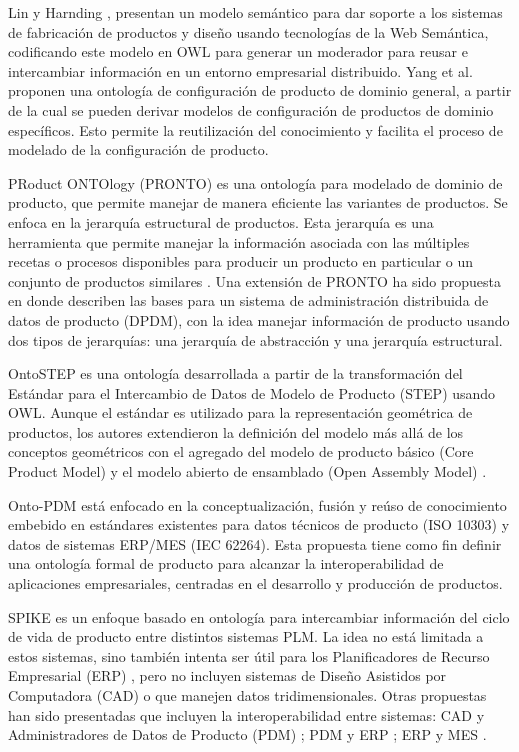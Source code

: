 \documentclass[journal]{IEEEtran}
\begin{document}
Lin y Harnding \cite{Lin2007}, presentan un modelo sem\'antico para dar soporte a los sistemas de fabricaci\'on de productos y dise\~no usando tecnolog\'ias de la Web Sem\'antica, codificando este modelo en OWL para generar un moderador para reusar e intercambiar informaci\'on en un entorno empresarial distribuido.
Yang et al. \cite{Yang2009} proponen una ontolog\'ia de configuraci\'on de producto de dominio general, a partir de la cual se pueden derivar modelos de configuraci\'on de productos de dominio espec\'ificos. Esto permite la reutilizaci\'on del conocimiento y facilita el proceso de modelado de la configuraci\'on de producto. 

PRoduct ONTOlogy (PRONTO) es una ontolog\'ia para modelado de dominio de producto, que permite manejar de manera eficiente las variantes de productos. Se enfoca en la jerarqu\'ia estructural de productos. Esta jerarqu\'ia es una herramienta que permite manejar la informaci\'on asociada con las m\'ultiples recetas o procesos disponibles para producir un producto en particular o un conjunto de productos similares \cite{Vegetti2005}. Una extensi\'on de PRONTO ha sido propuesta en \cite{Gimenez2006b} donde describen las bases para un sistema de administraci\'on distribuida de datos de producto (DPDM), con la idea manejar informaci\'on de producto usando dos tipos de jerarqu\'ias: una jerarqu\'ia de abstracci\'on y una jerarqu\'ia estructural. 

OntoSTEP \cite{ISOPrinciples} es una ontolog\'ia desarrollada a partir de la transformaci\'on del Est\'andar para el Intercambio de Datos de Modelo de Producto (STEP) usando OWL. Aunque el est\'andar es utilizado para la representaci\'on geom\'etrica de productos, los autores extendieron la definici\'on del modelo m\'as all\'a de los conceptos geom\'etricos con el agregado del modelo de producto b\'asico (Core Product Model) \cite{Foufou2005} y el modelo abierto de ensamblado (Open Assembly Model) \cite{Baysal2004a}. 

Onto-PDM \cite{Panetto2012} est\'a enfocado en la conceptualizaci\'on, fusi\'on y re\'uso de conocimiento embebido en est\'andares existentes para datos t\'ecnicos de producto (ISO 10303) y datos de sistemas ERP/MES (IEC 62264). Esta propuesta tiene como fin definir una ontolog\'ia formal de producto para alcanzar la interoperabilidad de aplicaciones empresariales, centradas en el desarrollo y producci\'on de productos.

SPIKE es un enfoque basado en ontolog\'ia para intercambiar informaci\'on del ciclo de vida de producto entre distintos sistemas PLM. La idea no est\'a limitada a estos sistemas, sino tambi\'en intenta ser \'util para los Planificadores de Recurso Empresarial (ERP) \cite{Bruno2016}, pero no incluyen sistemas de Dise\~no Asistidos por Computadora (CAD) o que manejen datos tridimensionales. Otras propuestas han sido presentadas que incluyen la interoperabilidad entre sistemas: CAD y Administradores de Datos de Producto (PDM) \cite{Paviot2011b}; PDM y ERP \cite{Paviot2011h}; ERP y MES \cite{Tursi2009}.
\end{document}
